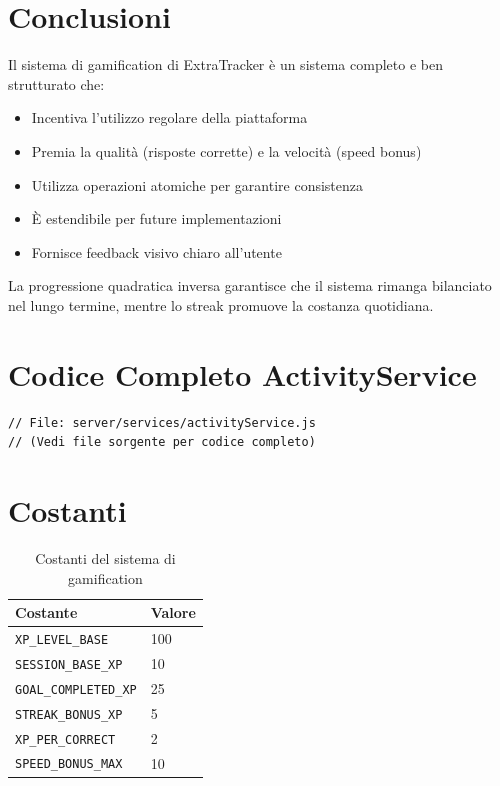 \documentclass[11pt,a4paper]{article}
\begin{document}
\section{Conclusioni}

Il sistema di gamification di ExtraTracker è un sistema completo e ben strutturato che:

\begin{itemize}
    \item Incentiva l'utilizzo regolare della piattaforma
    \item Premia la qualità (risposte corrette) e la velocità (speed bonus)
    \item Utilizza operazioni atomiche per garantire consistenza
    \item È estendibile per future implementazioni
    \item Fornisce feedback visivo chiaro all'utente
\end{itemize}

La progressione quadratica inversa garantisce che il sistema rimanga bilanciato nel lungo termine, mentre lo streak promuove la costanza quotidiana.

\appendix

\section{Codice Completo ActivityService}

\begin{lstlisting}
// File: server/services/activityService.js
// (Vedi file sorgente per codice completo)
\end{lstlisting}

\section{Costanti}

\begin{table}[H]
\centering
\begin{tabular}{@{}ll@{}}
\toprule
\textbf{Costante} & \textbf{Valore} \\
\midrule
\texttt{XP\_LEVEL\_BASE} & 100 \\
\texttt{SESSION\_BASE\_XP} & 10 \\
\texttt{GOAL\_COMPLETED\_XP} & 25 \\
\texttt{STREAK\_BONUS\_XP} & 5 \\
\texttt{XP\_PER\_CORRECT} & 2 \\
\texttt{SPEED\_BONUS\_MAX} & 10 \\
\bottomrule
\end{tabular}
\caption{Costanti del sistema di gamification}
\end{table}
\end{document}
